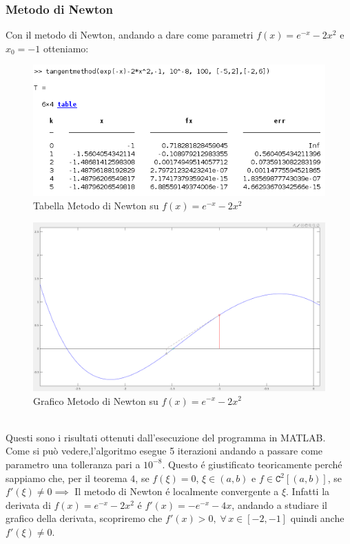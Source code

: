 \documentclass[12pt, letterpaper]{article}
\begin{document}
\subsubsection{Metodo di Newton}
Con il metodo di Newton, andando a dare come parametri $f(x)=e^{-x}-2x^2$ e $x_0=-1$ otteniamo:
\begin{figure}[ht!]
    \includegraphics[scale=0.63]{TabellaEsponenzialeNewton.png}
    \caption{Tabella Metodo di Newton su $f(x)=e^{-x}-2x^2$}
\end{figure}
\begin{figure}[ht!]
    \includegraphics[scale=0.4]{EsponenzialeNewton.png}
    \caption{Grafico Metodo di Newton su $f(x)=e^{-x}-2x^2$}
\end{figure} \\


Questi sono i risultati ottenuti dall'esecuzione del programma in MATLAB.\\ Come si può vedere,l'algoritmo esegue 5 iterazioni andando a passare come parametro una tolleranza pari a $10^{-8}$.
Questo \'e giustificato teoricamente perch\'e sappiamo che, per il teorema $4$, se $f(\xi)=0$, $\xi \in (a,b)$ e $f \in \mathtt{C}^2[(a,b)]$, se $f'(\xi) \neq 0 \implies$ Il metodo di Newton \'e localmente convergente a $\xi$.
Infatti la derivata di $f(x)=e^{-x}-2x^2$ \'e $f'(x)=-e^{-x}-4x$, andando a studiare il grafico della derivata, scopriremo che $f'(x)>0, \; \forall \, x \in [-2,-1]$ quindi anche $f'(\xi) \neq 0$. 
\end{document}
